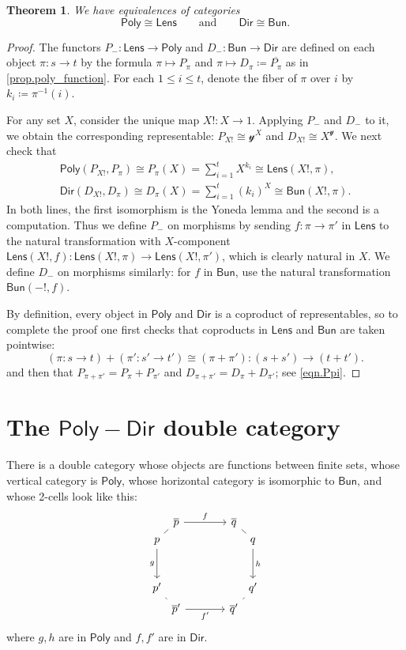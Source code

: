 \documentclass[11pt, article, one side]{memoir}
\theoremstyle{theorem}
\newtheorem{theorem}[equation]{Theorem}
\theoremstyle{definition}
\theoremstyle{remark}
\newcommand{\Cat}[1]{\mathsf{#1}}%
\newcommand{\inv}{^{-1}}
\newcommand{\lens}{\Cat{Lens}}
\newcommand{\bun}{\Cat{Bun}}
\newcommand{\yon}{\mathcal{y}}
\newcommand{\poly}{\Cat{Poly}}
\newcommand{\dir}{\Cat{Dir}}
\newcommand{\qqand}{\qquad\text{and}\qquad}
\begin{document}
\begin{theorem}
We have equivalences of categories
\[
\poly\cong\lens
\qqand
\dir\cong\bun.
\]
\end{theorem}
\begin{proof}
The functors $P_-\colon\lens\to\poly$ and $D_-\colon\bun\to\dir$ are defined on each object $\pi\colon s\to t$ by the formula $\pi\mapsto P_\pi$ and $\pi\mapsto D_\pi\coloneqq\overline{P_\pi}$ as in \cref{prop.poly_function}. For each $1\leq i\leq t$, denote the fiber of $\pi$ over $i$ by $k_i\coloneqq\pi\inv(i)$.

For any set $X$, consider the unique map $X!\colon X\to 1$. Applying $P_-$ and $D_-$ to it, we obtain the corresponding representable: $P_{X!}\cong\yon^X$ and $D_{X!}\cong X^\yon$. We next check that
 \begin{gather*}
  \poly(P_{X!},P_\pi)\cong 
  P_\pi(X)=
  \sum_{i=1}^{t}X^{k_i}\cong
  \lens(X!, \pi),
  \\
  \dir(D_{X!}, D_\pi)\cong 
  D_\pi(X)=
  \sum_{i=1}^{t}(k_i)^X\cong
  \bun(X!, \pi).
\end{gather*}
In both lines, the first isomorphism is the Yoneda lemma and the second is a computation. Thus we define $P_-$ on morphisms by sending $f\colon\pi\to\pi'$ in $\lens$ to the natural transformation with $X$-component $\lens(X!,f)\colon\lens(X!,\pi)\to\lens(X!,\pi')$, which is clearly natural in $X$. We define $D_-$ on morphisms similarly: for $f$ in $\bun$, use the natural transformation $\bun(-!,f)$.

By definition, every object in $\poly$ and $\dir$ is a coproduct of representables, so to complete the proof one first checks that coproducts in $\lens$ and $\bun$ are taken pointwise:
\[
(\pi\colon s\to t)+(\pi'\colon s'\to t')\cong(\pi+\pi')\colon (s+s')\to (t+t').
\]
and then that $P_{\pi+\pi'}=P_\pi+P_{\pi'}$ and $D_{\pi+\pi'}=D_\pi+D_{\pi'}$; see \cref{eqn.Ppi}.
\end{proof}

\chapter{The $\poly-\dir$ double category}

There is a double category whose objects are functions between finite sets, whose vertical category is $\poly$, whose horizontal category is isomorphic to $\bun$, and whose 2-cells look like this:
\[
\begin{tikzcd}[sep=large]
&[-35pt]
\overline{p}\ar[r, "f"]&
\overline{q}\\[-25pt]
p\ar[d, "g"']\arrow[ur, no head]&&&[-35pt]\ar[ul, no head]\ar[d, "h"]
q\\
p'\ar[dr, no head]&&&
q'\ar[dl, no head]\\[-25pt]&
\overline{p}'\ar[r, "f'"']&
\overline{q}'
\end{tikzcd}
\]
where $g,h$ are in $\poly$ and $f,f'$ are in $\dir$.
\end{document}
